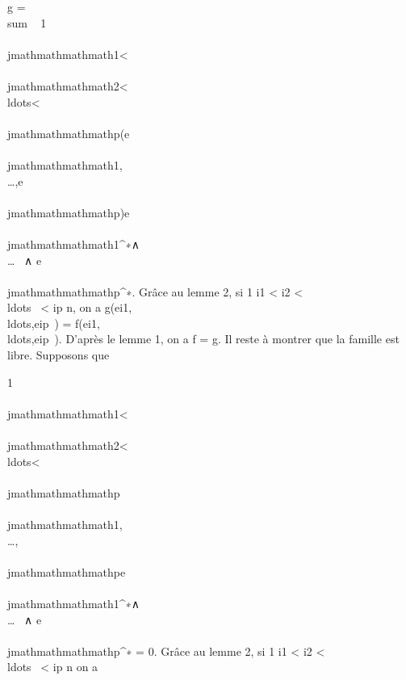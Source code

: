 g = \\sum ~
1\leq\\\\jmathmathmathmath1\textless{}\\\\jmathmathmathmath2\textless{}\\ldots\textless{}\\\\jmathmathmathmathp\leqnf(e\\\\jmathmathmathmath1,\\\ldots,e\\\\jmathmathmathmathp)e\\\\jmathmathmathmath1^∗∧\\\ldots~
∧ e\\\\jmathmathmathmathp^∗. Grâce au lemme 2, si 1 \leq
i1 \textless{} i2 \textless{}
\\ldots~ \textless{}
ip \leq n, on a
g(ei1,\\ldots,eip~)
=
f(ei1,\\ldots,eip~).
D'après le lemme 1, on a f = g. Il reste à montrer que la famille est
libre. Supposons que \\\sum

1\leq\\\\jmathmathmathmath1\textless{}\\\\jmathmathmathmath2\textless{}\\ldots\textless{}\\\\jmathmathmathmathp\leqn\lambda~\\\\jmathmathmathmath1,\\\ldots,\\\\jmathmathmathmathpe\\\\jmathmathmathmath1^∗∧\\\ldots~
∧ e\\\\jmathmathmathmathp^∗ = 0. Grâce au lemme 2, si 1 \leq
i1 \textless{} i2 \textless{}
\\ldots~ \textless{}
ip \leq n on a

